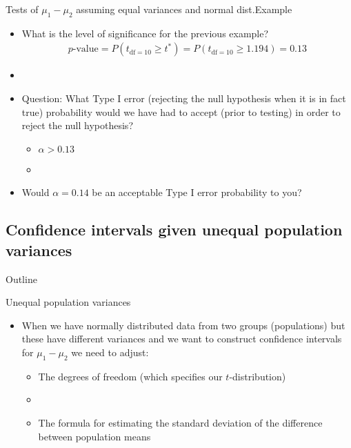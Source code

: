 \documentclass[xcolor=dvipsnames]{beamer}
\begin{document}
\begin{frame}{Tests of $\mu_1 - \mu_2$ assuming equal variances and normal dist.}{Example}
\begin{itemize}
	\item What is the level of significance for the previous example? \pause
	\begin{align*}
		p\text{-value}=P(t_{\text{df} = 10} \geq t^*) = P(t_{\text{df} = 10} \geq 1.194) = 0.13
	\end{align*}
	\item[]
	\item Question: What Type I error (rejecting the null hypothesis when it is in fact true) probability would we have had to accept (prior to testing) in order to reject the null hypothesis? \pause
	\begin{itemize}
		\item $\alpha > 0.13$
		\item[]
	\end{itemize} \pause
	\item Would $\alpha = 0.14$ be an acceptable Type I error probability to you?
\end{itemize}
\end{frame}

\subsection{Confidence intervals given unequal population variances}
\begin{frame}{Outline}
\tableofcontents[currentsection,subsectionstyle=show/shaded/hide]
\end{frame}

\begin{frame}{Unequal population variances}
	\begin{itemize}
		\item When we have normally distributed data from two groups (populations) but these have different variances and we want to construct confidence intervals for $\mu_1 -\mu_2$ we need to adjust: \pause
		\begin{itemize}
			\item The degrees of freedom (which specifies our $t$-distribution) \pause
			\item[]
			\item The formula for estimating the standard deviation of the difference between population means

		\end{itemize}
	\end{itemize}
\end{frame}
\end{document}

